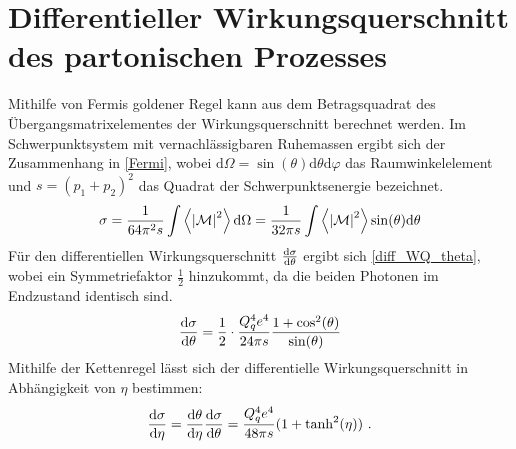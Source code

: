 \section{Differentieller Wirkungsquerschnitt des partonischen Prozesses}
\label{2.2}
Mithilfe von Fermis goldener Regel kann aus dem Betragsquadrat des Übergangsmatrixelementes der Wirkungsquerschnitt berechnet werden.
Im Schwerpunktsystem mit vernachlässigbaren Ruhemassen ergibt sich der Zusammenhang in \textsf{\autoref{Fermi}}, wobei $\text{d}\Omega = \sin(\theta)\text{d}\theta\text{d}\varphi$ das Raumwinkelelement und $s = (p_1 + p_2)^2$ das Quadrat der Schwerpunktsenergie bezeichnet.
\begin{equation}
\sigma = \frac{1}{64\pi^2s} \int \left\langle  \abs{\mathcal{M}}^2\right\rangle \text{d}\Omega = \frac{1}{32\pi s} \int \left\langle  \abs{\mathcal{M}}^2\right\rangle \sin(\theta) \text{d}\theta
\label{Fermi}
\end{equation}
Für den differentiellen Wirkungsquerschnitt $\derivative{\sigma}{\theta}$ ergibt sich \textsf{\autoref{diff_WQ_theta}}, wobei ein Symmetriefaktor $\frac{1}{2}$ hinzukommt, da die beiden Photonen im Endzustand identisch sind.
\begin{equation}
\derivative{\sigma}{\theta} = \frac{1}{2} \cdot \frac{Q_q^4e^4}{24\pi s}\frac{1+\cos^2(\theta)}{\sin(\theta)} 
\label{diff_WQ_theta}
\end{equation}
Mithilfe der Kettenregel lässt sich der differentielle Wirkungsquerschnitt in Abhängigkeit von $\eta$ bestimmen:
\begin{equation}
\derivative{\sigma}{\eta} =\derivative{\theta}{\eta}\derivative{\sigma}{\theta} =  \frac{Q_q^4e^4}{48\pi s}(1+\tanh^2(\eta))~.
\label{diff_WQ_eta}
\end{equation}

